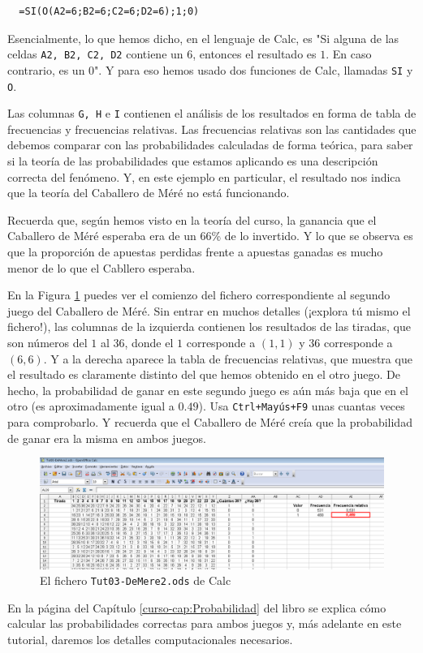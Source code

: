 \documentclass[10pt,a4paper]{article}\usepackage[]{graphicx}\usepackage[]{color}
\newcounter {cont01}
\begin{document}
\begin{verbatim}
  =SI(O(A2=6;B2=6;C2=6;D2=6);1;0)
\end{verbatim}
Esencialmente, lo que hemos dicho, en el lenguaje de Calc, es "Si alguna de las celdas {\tt A2, B2, C2, D2} contiene un 6, entonces el resultado es $1$. En caso contrario, es un $0$". Y para eso hemos usado dos funciones de Calc, llamadas {\tt SI} y {\tt O}.

Las columnas {\tt G, H} e {\tt I} contienen el análisis de los resultados en forma de tabla de frecuencias y frecuencias relativas. Las frecuencias relativas son las cantidades que debemos comparar con las probabilidades calculadas de forma teórica, para saber si la teoría de las probabilidades que estamos aplicando es una descripción correcta del fenómeno. Y, en este ejemplo en particular, el resultado nos indica que la teoría del Caballero de Méré no está funcionando.

Recuerda que, según hemos visto en la teoría del curso, la ganancia que el Caballero de Méré esperaba era de un 66\% de lo invertido. Y lo que se observa es que la proporción de apuestas perdidas frente a apuestas ganadas es mucho menor de lo que el Cabllero esperaba.

En la Figura \ref{tut03:fig:Tut03-DeMere2.ods} puedes ver el comienzo del fichero correspondiente al segundo juego del Caballero de Méré. Sin entrar en muchos detalles (¡explora tú mismo el fichero!), las columnas de la izquierda contienen los resultados de las tiradas, que son números del $1$ al $36$, donde el $1$ corresponde a $(1,1)$ y $36$ corresponde a $(6,6)$. Y a la derecha aparece la tabla de frecuencias relativas, que muestra que el resultado es claramente distinto del que hemos obtenido en el otro juego. De hecho, la probabilidad de ganar en este segundo juego es aún más baja que en el otro (es aproximadamente igual a $0.49$). Usa {\tt Ctrl+Mayús+F9} unas cuantas veces para comprobarlo. Y recuerda que el Caballero de Méré creía que la probabilidad de ganar era la misma en ambos juegos.
\begin{figure}[h!]
    \begin{center}
    \includegraphics[width=15cm]{../fig/Tut03-42.png}
    \end{center}
  \caption{El fichero {\tt Tut03-DeMere2.ods} de Calc}
  \label{tut03:fig:Tut03-DeMere2.ods}
\end{figure}
En la página \pageref{curso-cap03:subsubsec:JuegosDeMereCombinatoria} del Capítulo \ref{curso-cap:Probabilidad} del libro se explica cómo calcular las probabilidades correctas para ambos juegos y, más adelante en este tutorial, daremos los detalles computacionales necesarios.
\end{document}
